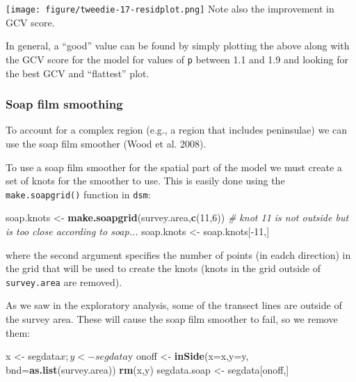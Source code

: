 \documentclass[]{article}
\newenvironment{Shaded}{}{}
\newcommand{\KeywordTok}[1]{\textcolor[rgb]{0.00,0.44,0.13}{\textbf{{#1}}}}
\newcommand{\DataTypeTok}[1]{\textcolor[rgb]{0.56,0.13,0.00}{{#1}}}
\newcommand{\DecValTok}[1]{\textcolor[rgb]{0.25,0.63,0.44}{{#1}}}
\newcommand{\StringTok}[1]{\textcolor[rgb]{0.25,0.44,0.63}{{#1}}}
\newcommand{\CommentTok}[1]{\textcolor[rgb]{0.38,0.63,0.69}{\textit{{#1}}}}
\newcommand{\NormalTok}[1]{{#1}}
\begin{document}
\texttt{[image: figure/tweedie-17-residplot.png]} Note also the
improvement in GCV score.

In general, a ``good'' value can be found by simply plotting the above
along with the GCV score for the model for values of \texttt{p} between
1.1 and 1.9 and looking for the best GCV and ``flattest'' plot.

\subsubsection{Soap film smoothing}\label{soap-film-smoothing}

To account for a complex region (e.g., a region that includes
peninsulae) we can use the soap film smoother (Wood et al. 2008).

To use a soap film smoother for the spatial part of the model we must
create a set of knots for the smoother to use. This is easily done using
the \texttt{make.soapgrid()} function in \texttt{dsm}:

\begin{Shaded}
\begin{Highlighting}[]
\NormalTok{soap.knots <-}\StringTok{ }\KeywordTok{make.soapgrid}\NormalTok{(survey.area,}\KeywordTok{c}\NormalTok{(}\DecValTok{11}\NormalTok{,}\DecValTok{6}\NormalTok{))}
\CommentTok{# knot 11 is not outside but is too close according to soap...}
\NormalTok{soap.knots <-}\StringTok{ }\NormalTok{soap.knots[-}\DecValTok{11}\NormalTok{,]}
\end{Highlighting}
\end{Shaded}

where the second argument specifies the number of points (in eadch
direction) in the grid that will be used to create the knots (knots in
the grid outside of \texttt{survey.area} are removed).

As we saw in the exploratory analysis, some of the transect lines are
outside of the survey area. These will cause the soap film smoother to
fail, so we remove them:

\begin{Shaded}
\begin{Highlighting}[]
\NormalTok{x <-}\StringTok{ }\NormalTok{segdata$x; y<-segdata$y}
\NormalTok{onoff <-}\StringTok{ }\KeywordTok{inSide}\NormalTok{(}\DataTypeTok{x=}\NormalTok{x,}\DataTypeTok{y=}\NormalTok{y, }\DataTypeTok{bnd=}\KeywordTok{as.list}\NormalTok{(survey.area))}
\KeywordTok{rm}\NormalTok{(x,y)}
\NormalTok{segdata.soap <-}\StringTok{ }\NormalTok{segdata[onoff,]}
\end{Highlighting}
\end{Shaded}
\end{document}

